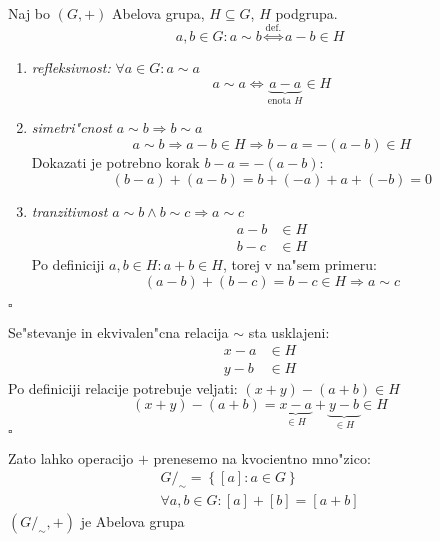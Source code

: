 Naj bo $(G, +)$ Abelova grupa, $H \subseteq G$, $H$ podgrupa.
\begin{equation*}
a, b \in G: a \sim b \stackrel{\text{def.}}{\iff} a - b \in H
\end{equation*}
\begin{enumerate}[(1)]
	\item \emph{refleksivnost:} $\forall a \in G: a \sim a$
	\begin{equation*}
	a \sim a \iff \underbrace{a - a}_{\text{enota $H$}} \in H
	\end{equation*}
	
	\item \emph{simetri"cnost} $a \sim b \Rightarrow b \sim a$
	\begin{equation*}
	a \sim b \Rightarrow a - b \in H \Rightarrow b - a = - (a - b) \in H
	\end{equation*}
	Dokazati je potrebno korak $b - a = -(a - b)$:
	\begin{equation*}
	(b-a) + (a - b) = b + (-a) + a + (-b) = 0
	\end{equation*}
	
	\item \emph{tranzitivnost} $a \sim b \land b \sim c \Rightarrow a \sim c$
	\begin{align*}
	a - b &\in H \\
	b - c &\in H
	\end{align*}
	Po definiciji $a, b \in H: a + b \in H$, torej v na"sem primeru:
	\begin{equation*}
	(a - b )+ (b - c)  = b - c \in H \Rightarrow a \sim c
	\end{equation*}
\end{enumerate}
\hfill $\square$

Se"stevanje in ekvivalen"cna relacija $\sim$ sta usklajeni:
\begin{align*}
x - a &\in H \\
y - b &\in H
\end{align*}
Po definiciji relacije potrebuje veljati: $(x + y) - (a + b) \in H$
\begin{equation*}
(x + y) - (a + b) = \underbrace{x - a}_{\in H} + \underbrace{y - b}_{\in H} \in H
\end{equation*}
\hfill $\square$

Zato lahko operacijo $+$ prenesemo na kvocientno mno"zico:
\begin{gather*}
G/_\sim = \left\{[a]: a \in G\right\} \\
\forall a, b \in G: [a] + [b] = [a + b]
\end{gather*}
$(G/_\sim, +)$ je Abelova grupa

